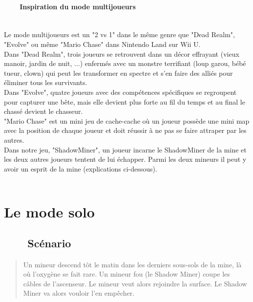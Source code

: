 \documentclass[titlepage, 13px, a4paper]{report}
\begin{document}
\paragraph{~~~~Inspiration du mode multijoueurs} \hspace{0pt} \\
Le mode multijoueurs est un "2 vs 1" dans le même genre que "Dead Realm", "Evolve" 
ou même "Mario Chase" dans Nintendo Land sur Wii U. 
\\
Dans "Dead Realm", trois joueurs se retrouvent dans un décor effrayant (vieux manoir, jardin de nuit, ...) enfermés 
avec un monstre terrifiant (loup garou, bébé tueur, clown) qui peut les transformer 
en spectre et s'en faire des alliés pour éliminer tous les survivants. 
\\
Dans "Evolve", quatre joueurs avec des compétences spécifiques se regroupent pour capturer 
une bête, mais elle devient plus forte au fil du temps et au final le chassé devient le chasseur. 
\\
"Mario Chase" est un mini jeu de cache-cache où un joueur possède une mini map 
avec la position de chaque joueur et doit réussir à ne pas se faire attraper par les autres. 
\\
Dans notre jeu, "ShadowMiner", un joueur incarne le ShadowMiner de la mine et les deux autres 
joueurs tentent de lui échapper. Parmi les deux mineurs il peut y avoir un esprit de la mine (explications ci-dessous). \\ \\


\section{Le mode solo}

\subsection[Scénario]{~~~~Scénario}
\paragraph{} \hspace{0pt}
\begin{quotation}
	Un mineur descend tôt le matin dans les derniers sous-sols de la mine, là où l’oxygène se fait rare. 
	Un mineur fou (le Shadow Miner) coupe les câbles de l’ascenseur. 
	Le mineur veut alors rejoindre la surface. Le Shadow Miner va alors vouloir l’en empêcher. \\
\end{quotation}
\end{document}
